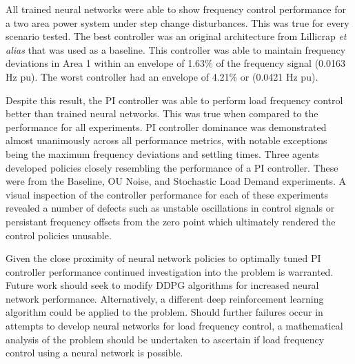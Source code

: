 All trained neural networks were able to show frequency control performance for a two area power system under step change disturbances. This was true for every scenario tested. The best controller was an original architecture from Lillicrap \textit{et alias} that was used as a baseline. This controller was able to maintain frequency deviations in Area 1 within an envelope of 1.63\% of the frequency signal (0.0163 Hz pu). The worst controller had an envelope of 4.21\% or (0.0421 Hz pu).

Despite this result, the PI controller was able to perform load frequency control better than trained neural networks. This was true when compared to the performance for all experiments. PI controller dominance was demonstrated almost unanimously across all performance metrics, with notable exceptions being the maximum frequency deviations and settling times. Three agents developed policies closely resembling the performance of a PI controller. These were from the Baseline, OU Noise, and Stochastic Load Demand experiments. A visual inspection of the controller performance for each of these experiments revealed a number of defects such as unstable oscillations in control signals or persistant frequency offsets from the zero point which ultimately rendered the control policies unusable.

Given the close proximity of neural network policies to optimally tuned PI controller performance continued investigation into the problem is warranted. Future work should seek to modify DDPG algorithms for increased neural network performance. Alternatively, a different deep reinforcement learning algorithm could be applied to the problem. Should further failures occur in attempts to develop neural networks for load frequency control, a mathematical analysis of the problem should be undertaken to ascertain if load frequency control using a neural network is possible.